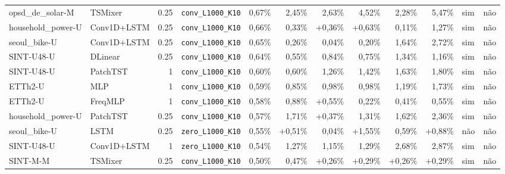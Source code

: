 \begin{longtable}{llrlrrrrrrll}
opsd\_de\_solar-M & TSMixer & 0.25 & \texttt{conv\_\allowbreak{}L1000\_\allowbreak{}K10} & \textminus{}0,67\% & \textminus{}2,45\% & \textminus{}2,63\% & \textminus{}4,52\% & \textminus{}2,28\% & \textminus{}5,47\% & sim & n\~ao \\
household\_power-U & Conv1D+LSTM & 0.25 & \texttt{conv\_\allowbreak{}L1000\_\allowbreak{}K10} & \textminus{}0,66\% & \textminus{}0,33\% & +0,36\% & +0,63\% & \textminus{}0,11\% & \textminus{}1,27\% & sim & n\~ao \\
seoul\_bike-U & Conv1D+LSTM & 0.25 & \texttt{conv\_\allowbreak{}L1000\_\allowbreak{}K10} & \textminus{}0,65\% & \textminus{}0,26\% & \textminus{}0,04\% & \textminus{}0,20\% & \textminus{}1,64\% & \textminus{}2,72\% & sim & n\~ao \\
SINT-U48-U & DLinear & 0.25 & \texttt{conv\_\allowbreak{}L1000\_\allowbreak{}K10} & \textminus{}0,64\% & \textminus{}0,55\% & \textminus{}0,84\% & \textminus{}0,75\% & \textminus{}1,34\% & \textminus{}1,16\% & sim & n\~ao \\
SINT-U48-U & PatchTST & 1 & \texttt{conv\_\allowbreak{}L1000\_\allowbreak{}K10} & \textminus{}0,60\% & \textminus{}0,60\% & \textminus{}1,26\% & \textminus{}1,42\% & \textminus{}1,63\% & \textminus{}1,80\% & sim & n\~ao \\
ETTh2-U & MLP & 1 & \texttt{conv\_\allowbreak{}L1000\_\allowbreak{}K10} & \textminus{}0,59\% & \textminus{}0,85\% & \textminus{}0,98\% & \textminus{}0,98\% & \textminus{}1,19\% & \textminus{}1,73\% & sim & n\~ao \\
ETTh2-U & FreqMLP & 1 & \texttt{conv\_\allowbreak{}L1000\_\allowbreak{}K10} & \textminus{}0,58\% & \textminus{}0,88\% & +0,55\% & \textminus{}0,22\% & \textminus{}0,41\% & \textminus{}0,55\% & sim & n\~ao \\
household\_power-U & PatchTST & 0.25 & \texttt{conv\_\allowbreak{}L1000\_\allowbreak{}K10} & \textminus{}0,57\% & \textminus{}1,71\% & +0,37\% & \textminus{}1,31\% & \textminus{}1,62\% & \textminus{}2,36\% & sim & n\~ao \\
seoul\_bike-U & LSTM & 0.25 & \texttt{zero\_\allowbreak{}L1000\_\allowbreak{}K10} & \textminus{}0,55\% & +0,51\% & \textminus{}0,04\% & +1,55\% & \textminus{}0,59\% & +0,88\% & n\~ao & n\~ao \\
SINT-U48-U & Conv1D+LSTM & 1 & \texttt{zero\_\allowbreak{}L1000\_\allowbreak{}K10} & \textminus{}0,54\% & \textminus{}1,27\% & \textminus{}1,15\% & \textminus{}1,29\% & \textminus{}2,68\% & \textminus{}2,87\% & sim & n\~ao \\
SINT-M-M & TSMixer & 0.25 & \texttt{conv\_\allowbreak{}L1000\_\allowbreak{}K10} & \textminus{}0,50\% & \textminus{}0,47\% & +0,26\% & +0,29\% & +0,26\% & +0,29\% & sim & n\~ao \\

\end{longtable}
